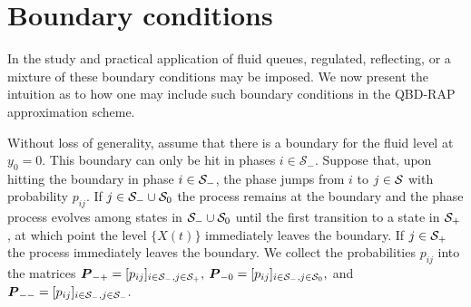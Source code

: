 %


\section{Boundary conditions}\label{sec: boundary conditions}
In the study and practical application of fluid queues, regulated, reflecting, or a mixture of these boundary conditions may be imposed. We now present the intuition as to how one may include such boundary conditions in the QBD-RAP approximation scheme. 

Without loss of generality, assume that there is a boundary for the fluid level at \(y_0 = 0\). This boundary can only be hit in phases \(i\in\mathcal S_-\). %
Suppose that, upon hitting the boundary in phase \(i\in\mathcal{S}_-\), the phase jumps from \(i\) to \(j\in\mathcal{S}\) with probability \(p_{ij}\). If \(j\in\mathcal{S}_-\cup\mathcal{S}_0\) the process remains at the boundary and the phase process evolves among states in \(\mathcal{S}_-\cup\mathcal{S}_0\) until the first transition to a state in \(\mathcal{S}_+\), at which point the level \(\{X(t)\}\) immediately leaves the boundary. If \(j\in\mathcal{S}_+\) the process immediately leaves the boundary. 
We collect the probabilities \(p_{ij}\) into the matrices \(\boldsymbol P_{-+} = [p_{ij}]_{i\in\mathcal{S}_-,j\in\mathcal{S}_+},\) \(\boldsymbol P_{-0} = [p_{ij}]_{i\in\mathcal{S}_-,j\in\mathcal{S}_0},\) and \(\boldsymbol P_{--} = [p_{ij}]_{i\in\mathcal{S}_-,j\in\mathcal{S}_-}.\)

